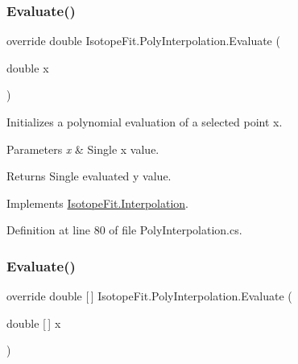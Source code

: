 \subsubsection{\texorpdfstring{Evaluate()}{Evaluate()}\hspace{0.1cm}{\footnotesize\ttfamily [1/2]}}
{\footnotesize\ttfamily override double Isotope\+Fit.\+Poly\+Interpolation.\+Evaluate (\begin{DoxyParamCaption}\item[{double}]{x }\end{DoxyParamCaption})\hspace{0.3cm}{\ttfamily [virtual]}}



Initializes a polynomial evaluation of a selected point x. 


\begin{DoxyParams}{Parameters}
{\em x} & Single x value.\\
\hline
\end{DoxyParams}
\begin{DoxyReturn}{Returns}
Single evaluated y value.
\end{DoxyReturn}


Implements \mbox{\hyperlink{class_isotope_fit_1_1_interpolation}{Isotope\+Fit.\+Interpolation}}.



Definition at line 80 of file Poly\+Interpolation.\+cs.

\mbox{\label{class_isotope_fit_1_1_poly_interpolation_ad6c5b40f7a718d934c5a3ed7f55c5eb3}} 
\subsubsection{\texorpdfstring{Evaluate()}{Evaluate()}\hspace{0.1cm}{\footnotesize\ttfamily [2/2]}}
{\footnotesize\ttfamily override double \mbox{[}$\,$\mbox{]} Isotope\+Fit.\+Poly\+Interpolation.\+Evaluate (\begin{DoxyParamCaption}\item[{double \mbox{[}$\,$\mbox{]}}]{x }\end{DoxyParamCaption})\hspace{0.3cm}{\ttfamily [virtual]}}



